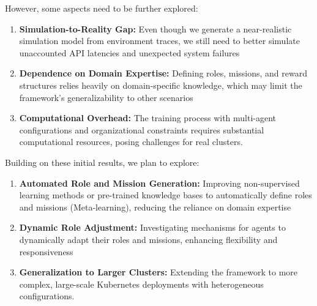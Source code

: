 However, some aspects need to be further explored:
\begin{enumerate}[label=\textbf{\arabic*)}, itemjoin={;\quad }]
    \item \textbf{Simulation-to-Reality Gap:} Even though we generate a near-realistic simulation model from environment traces, we still need to better simulate unaccounted API latencies and unexpected system failures
    \item \textbf{Dependence on Domain Expertise:} Defining roles, missions, and reward structures relies heavily on domain-specific knowledge, which may limit the framework's generalizability to other scenarios
    \item \textbf{Computational Overhead:} The training process with multi-agent configurations and organizational constraints requires substantial computational resources, posing challenges for real clusters.
\end{enumerate}

Building on these initial results, we plan to explore:
\begin{enumerate}[label=\textbf{\arabic*)}, itemjoin={;\quad }]
    \item \textbf{Automated Role and Mission Generation:} Improving non-supervised learning methods or pre-trained knowledge bases to automatically define roles and missions (Meta-learning), reducing the reliance on domain expertise
    \item \textbf{Dynamic Role Adjustment:} Investigating mechanisms for agents to dynamically adapt their roles and missions, enhancing flexibility and responsiveness
    \item \textbf{Generalization to Larger Clusters:} Extending the framework to more complex, large-scale Kubernetes deployments with heterogeneous configurations.
\end{enumerate}

